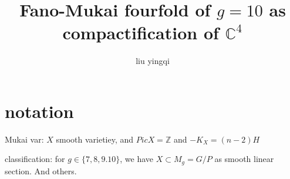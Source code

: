 \documentclass{article}
\title{Fano-Mukai fourfold of $g=10$ as compactification of $\mathbb{C}^{4}$}
\author{liu yingqi}
\begin{document}
\maketitle
\section{notation}
Mukai var: $ X $ smooth varietiey, and $ PicX = \mathbb{Z} $ and $ -K_{X}=(n-2)H $

classification: for $ g \in \{ 7,8,9.10\}   $, we have $ X \subset M_{g}=G/P $ as smooth linear section. And others.
\end{document}
